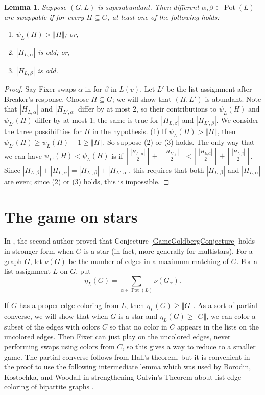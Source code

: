 \documentclass[12pt,reqno]{amsart}
\theoremstyle{plain}
\newtheorem{lem}[thm]{Lemma}
\theoremstyle{definition}
\theoremstyle{remark}
\newcommand{\card}[1]{\left|#1\right|}
\newcommand{\size}[1]{\left\Vert#1\right\Vert}
\newcommand{\floor}[1]{\left\lfloor#1\right\rfloor}
\newcommand{\pot}{\operatorname{Pot}}
\begin{document}
\begin{lem}\label{SwappableCondition}
Suppose $(G, L)$ is superabundant.  Then different $\alpha, \beta \in \pot(L)$ are swappable if for every $H \subseteq G$, at least one of the following holds:
\begin{enumerate}
\item $\psi_L(H) > \size{H}$; or,
\item $\card{H_{L, \alpha}}$ is odd; or,
\item $\card{H_{L, \beta}}$ is odd.
\end{enumerate}
\end{lem}
%
\begin{proof}
Say Fixer swaps $\alpha$ in for $\beta$ in $L(v)$. Let $L'$ be the list
assignment after Breaker's response.  Choose $H \subseteq G$; we will show that
$(H,L')$ is abundant.  Note that $\card{H_{L,\alpha}}$ and
$\card{H_{L',\alpha}}$ differ by at most 2, so their contributions to
$\psi_L(H)$ and $\psi_{L'}(H)$ differ by at most 1; the same is true for
$\card{H_{L,\beta}}$ and $\card{H_{L',\beta}}$.  
We consider the three
possibilities for $H$ in the hypothesis.  (1) If $\psi_L(H)>\size{H}$, then
$\psi_{L'}(H) \ge \psi_L(H)-1\ge \size{H}$. 
So suppose (2) or (3) holds.
The only way that we can have
$\psi_{L'}(H)<\psi_L(H)$ is if $\floor{\frac{\card{H_{L', \alpha}}}{2}} +
\floor{\frac{\card{H_{L', \beta}}}{2}} < \floor{\frac{\card{H_{L, \alpha}}}{2}}
+ \floor{\frac{\card{H_{L, \beta}}}{2}}$.  
Since $\card{H_{L, \beta}} + \card{H_{L, \alpha}} = \card{H_{L', \beta}} +
\card{H_{L', \alpha}}$,   this requires that both $\card{H_{L, \beta}}$ and
$\card{H_{L, \alpha}}$ are even; since (2) or (3) holds, this is impossible.
\end{proof}

\section{The game on stars}
In \cite{HallGame}, the second author proved that Conjecture \ref{GameGoldbergConjecture} holds in stronger form when $G$ is a star (in fact, more generally for multistars).  For a graph $G$, let $\nu(G)$ be the number of edges in a maximum matching of $G$. 
For a list assignment $L$ on $G$, put
\[\eta_L(G) = \sum_{\alpha \in \pot(L)} \nu(G_\alpha).\]

If $G$ has a proper edge-coloring from $L$, then $\eta_L(G) \ge \size{G}$.  As a
sort of partial converse, we will show that when $G$ is a star and $\eta_L(G)
\ge \size{G}$, we can color a subset of the edges with colors $C$ so that no
color in $C$ appears in the lists on the uncolored edges.  Then Fixer can just
play on the uncolored edges, never performing swaps using colors from $C$, so
this gives a way to reduce to a smaller game.  The partial converse follows
from Hall's theorem, but it is convenient in the proof to use the following
intermediate lemma which was used by Borodin, Kostochka, and Woodall
\cite{BorodinKostochkaWoodall} in strengthening Galvin's Theorem about list
edge-coloring of bipartite graphs \cite{galvin1995list}.  
\end{document}
